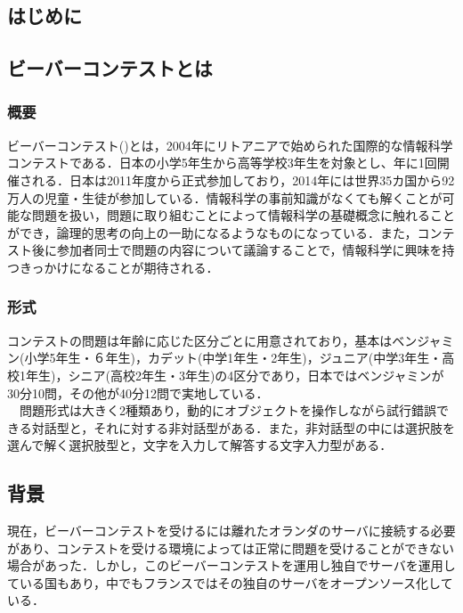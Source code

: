 \documentclass[a4paper]{jarticle}
\begin{document}
\maketitle
\begin{multicols}{2}
\setcounter{page}{1}

\section{はじめに}

\subsection{ビーバーコンテストとは}
\subsubsection{概要}
ビーバーコンテスト(\cite{bebras-contest, bebras-pdf})とは，2004年にリトアニアで始められた国際的な情報科学コンテストである．日本の小学5年生から高等学校3年生を対象とし、年に1回開催される．日本は2011年度から正式参加しており，2014年には世界35カ国から92万人の児童・生徒が参加している．情報科学の事前知識がなくても解くことが可能な問題を扱い，問題に取り組むことによって情報科学の基礎概念に触れることができ，論理的思考の向上の一助になるようなものになっている．また，コンテスト後に参加者同士で問題の内容について議論することで，情報科学に興味を持つきっかけになることが期待される．

\subsubsection{形式}
 コンテストの問題は年齢に応じた区分ごとに用意されており，基本はベンジャミン(小学5年生・６年生)，カデット(中学1年生・2年生)，ジュニア(中学3年生・高校1年生)，シニア(高校2年生・3年生)の4区分であり，日本ではベンジャミンが30分10問，その他が40分12問で実地している．
\\　問題形式は大きく2種類あり，動的にオブジェクトを操作しながら試行錯誤できる対話型と，それに対する非対話型がある．また，非対話型の中には選択肢を選んで解く選択肢型と，文字を入力して解答する文字入力型がある．

\subsection{背景}
現在，ビーバーコンテストを受けるには離れたオランダのサーバに接続する必要があり、コンテストを受ける環境によっては正常に問題を受けることができない場合があった．しかし，このビーバーコンテストを運用し独自でサーバを運用している国もあり，中でもフランスではその独自のサーバをオープンソース化している．

\end{multicols}
\end{document}
